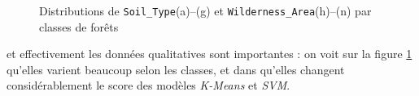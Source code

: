 \documentclass[12pt,a4paper]{article}
\numberwithin{equation}{section}
\newcommand{\wilderness}{\texttt{Wilderness\_Area}}
\newcommand{\soil}{\texttt{Soil\_Type}}
\begin{document}
\begin{figure}[h]
		\medskip
		
		\caption{Distributions de \soil (a)--(g) et \wilderness (h)--(n) par classes de forêts}
		\label{fig:soil-wild_hist}
	\end{figure}
	
	et effectivement les données qualitatives sont importantes : on voit sur la figure \ref{fig:soil-wild_hist} qu'elles varient beaucoup selon les classes, et dans \cite{C-D} qu'elles changent considérablement le score des modèles \textit{K-Means} et \textit{SVM}.
	
	\newpage
	
	
	
	
	
\end{document}
